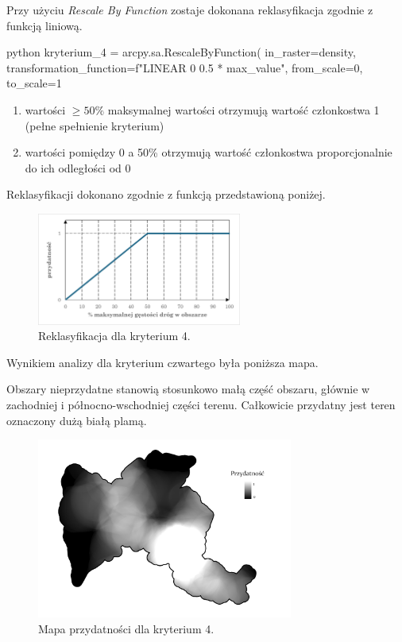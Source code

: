 \documentclass{article}
\begin{document}
Przy użyciu \textit{Rescale By Function} zostaje dokonana reklasyfikacja zgodnie z funkcją liniową.
\vspace{5pt}

\begin{mintedbox}{python}
kryterium_4 = arcpy.sa.RescaleByFunction(
    in_raster=density,
    transformation_function=f"LINEAR 0 {0.5 * max_value}",
    from_scale=0,
    to_scale=1   
\end{mintedbox}

\begin{enumerate}[label=•]
    \item wartości \( \geq 50\% \) maksymalnej wartości otrzymują wartość członkostwa 1 (pełne spełnienie kryterium)
    \item wartości pomiędzy 0 a 50\% otrzymują wartość członkostwa proporcjonalnie do ich odległości od 0
\end{enumerate}
\vspace{5pt}
\vspace{10pt}

Reklasyfikacji dokonano zgodnie z funkcją przedstawioną poniżej.
\vspace{5pt}

\begin{figure}[H]
    \centering
    \includegraphics[width=0.6\textwidth]{img/kryterium4-wykres-glowny.png}
    \caption{Reklasyfikacja dla kryterium 4.}
\end{figure}
\vspace{10pt}

Wynikiem analizy dla kryterium czwartego była poniższa mapa.

Obszary nieprzydatne stanowią stosunkowo małą część obszaru, głównie w zachodniej i północno-wschodniej części terenu. Całkowicie przydatny jest teren oznaczony dużą białą plamą.

\begin{figure}[H]
    \centering
    \includegraphics[width=0.75\textwidth]{img/kryterium4-layout.jpg}
    \caption{Mapa przydatności dla kryterium 4.}
\end{figure}
\end{document}
